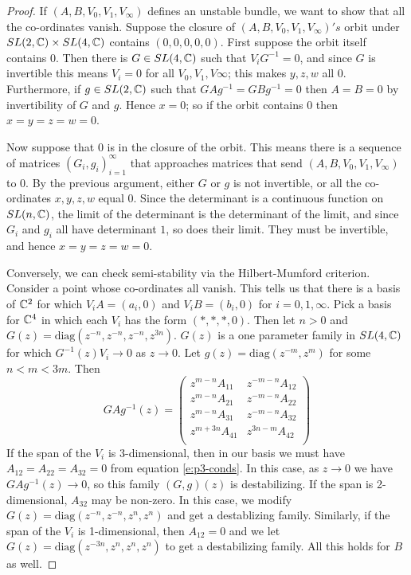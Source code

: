 	\begin{proof}
		If $(A,B,V_0,V_1,V_\infty)$ defines an unstable bundle, we want to show that all the co-ordinates vanish. Suppose the closure of $(A,B,V_0,V_1,V_\infty)'s$ orbit under $SL(2,\mathbb{C})\times SL(4,\mathbb{C})$ contains $(0,0,0,0,0)$. First suppose the orbit itself contains $0$. Then there is $G\in SL(4,\mathbb{C})$ such that $V_i G^{-1} =0$, and since $G$ is invertible this means $V_i = 0$ for all $V_0,V_1,V\infty$; this makes $y,z,w$ all 0. Furthermore, if $g\in SL(2,\mathbb{C})$ such that $GAg^{-1} = GBg^{-1} =0$ then $A=B=0$ by invertibility of $G$ and $g$. Hence $x=0$; so if the orbit contains $0$ then $x=y=z=w=0$. 
		
		Now suppose that $0$ is in the closure of the orbit. This means there is a sequence of matrices $(G_i,g_i)_{i=1}^\infty$ that approaches matrices that send $(A,B,V_0,V_1,V_\infty)$ to $0$. By the previous argument, either $G$ or $g$ is not invertible, or all the co-ordinates $x,y,z,w$ equal 0. Since the determinant is a continuous function on $SL(n,\mathbb{C})$, the limit of the determinant is the determinant of the limit, and since $G_i$ and $g_i$ all have determinant $1$, so does their limit. They must be invertible, and hence $x=y=z=w=0$.\vspace{1em}
		
		Conversely, we can check semi-stability via the Hilbert-Mumford criterion. Consider a point whose co-ordinates all vanish. This tells us that there is a basis of $\mathbb{C}^2$ for which $V_i A = (a_i,0)$ and $V_i B = (b_i ,0)$ for $i=0,1,\infty$. Pick a basis for $\mathbb{C}^4$ in which each $V_i$ has the form $(\ast,\ast,\ast,0)$. Then let $n>0$ and $G(z) = \text{diag}(z^{-n}, z^{-n}, z^{-n}, z^{3n})$. $G(z)$ is a one parameter family in $SL(4,\mathbb{C})$ for which $G^{-1}(z)V_i \to 0$ as $z\to 0$. Let $g(z) = \text{diag}(z^{-m}, z^{m})$ for some $n < m < 3m$. Then
		\begin{equation}
			GAg^{-1}(z) =
			\begin{pmatrix}
			z^{m-n} A_{11} & z^{-m-n}A_{12}\\
			z^{m-n} A_{21} & z^{-m-n}A_{22}\\
			z^{m-n} A_{31} & z^{-m-n}A_{32}\\
			z^{m+3n} A_{41} & z^{3n-m}A_{42}\\
			\end{pmatrix} 
		\end{equation}
		If the span of the $V_i$ is 3-dimensional, then in our basis we must have $A_{12}=A_{22}=A_{32}=0$ from equation \ref{e:p3-conds}. In this case, as $z\to 0$ we have $GAg^{-1}(z) \to 0$, so this family $(G,g)(z)$ is destabilizing. If the span is 2-dimensional, $A_{32}$ may be non-zero. In this case, we modify $G(z) = \text{diag}(z^{-n}, z^{-n}, z^n, z^n)$ and get a destablizing family. Similarly, if the span of the $V_i$ is 1-dimensional, then $A_{12}=0$ and we let $G(z) = \text{diag}(z^{-3n}, z^n, z^n, z^n)$ to get a destabilizing family. All this holds for $B$ as well.
		

\end{proof}
